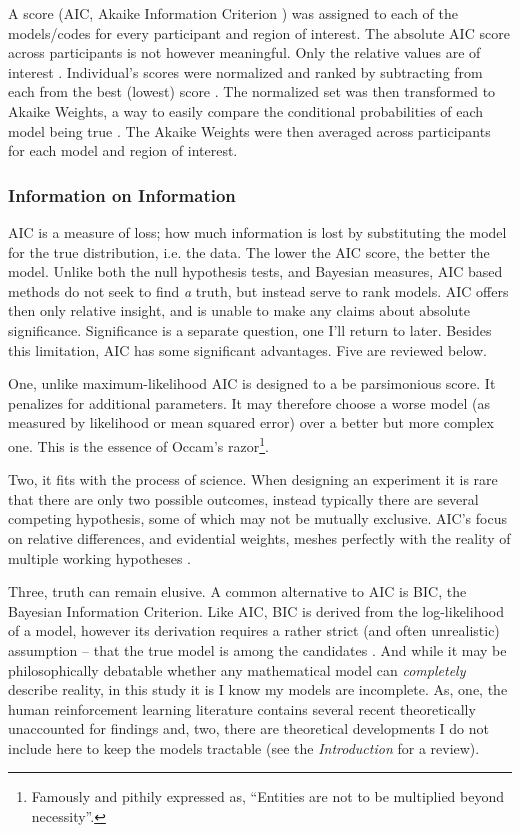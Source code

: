 \documentclass[doc,12pt]{apa}        %
\begin{document}
A score (AIC, Akaike Information Criterion \cite{Akaike:1974p9530}) was assigned to each of the models/codes for every participant and region of interest.  The absolute AIC score across participants is not however meaningful.  Only the relative values are of interest \cite{Wagenmakers:2004p9472}.  Individual's scores were normalized and ranked by subtracting from each from the best (lowest) score \cite{Anderson:2000p9475}. The normalized set was then transformed to Akaike Weights, a way to easily compare the conditional probabilities of each model being true \cite{Wagenmakers:2004p9472}.  The Akaike Weights were then averaged across participants for each model and region of interest.

\subsubsection{Information on Information}
\label{subsub:way}
AIC is a measure of loss; how much information is lost by substituting the model for the true distribution, i.e. the data.  The lower the AIC score, the better the model.  Unlike both the null hypothesis tests, and Bayesian measures, AIC based methods do not seek to find \emph{a} truth, but instead serve to rank models.  AIC offers then only relative insight, and is unable to make any claims about absolute significance.  Significance is a separate question, one I'll return to later.  Besides this limitation, AIC has some significant advantages. Five are reviewed below.

One, unlike maximum-likelihood AIC is designed to a be parsimonious score.  It penalizes for additional parameters.  It may therefore choose a worse model (as measured by likelihood or mean squared error) over a better but more complex one. This is the essence of Occam's razor\footnote{Famously and pithily expressed as, ``Entities are not to be multiplied beyond necessity''.}. 

Two, it fits with the process of science.  When designing an experiment it is rare that there are only two possible outcomes, instead typically there are several competing hypothesis, some of which may not be mutually exclusive.  AIC's focus on relative differences, and evidential weights, meshes perfectly with the reality of multiple working hypotheses \cite{Burnham:2004p9621}.

Three, truth can remain elusive.  A common alternative to AIC is BIC, the Bayesian Information Criterion.  Like AIC, BIC is derived from the log-likelihood of a model, however its derivation requires a rather strict (and often unrealistic) assumption -- that the true model is among the candidates \cite{Forster:2000p9623}.  And while it may be philosophically debatable whether any mathematical model can \emph{completely} describe reality, in this study it is I know my models are incomplete.  As, one, the human reinforcement learning literature contains several recent theoretically unaccounted for findings and, two, there are theoretical developments I do not include here to keep the models tractable (see the \emph{Introduction} for a review).  
\end{document}
